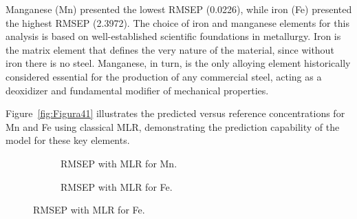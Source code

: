 \documentclass[12pt]{article}
\newcommand{\namostras}{Nº de amostras}
\newcommand{\oautor}{o autor}
\begin{document}
Manganese (Mn) presented the lowest RMSEP (0.0226), while iron (Fe) presented the highest RMSEP (2.3972). The choice of iron and manganese elements for this analysis is based on well-established scientific foundations in metallurgy. Iron is the matrix element that defines the very nature of the material, since without iron there is no steel. Manganese, in turn, is the only alloying element historically considered essential for the production of any commercial steel, acting as a deoxidizer and fundamental modifier of mechanical properties.

Figure~\ref{fig:Figura41} illustrates the predicted versus reference concentrations for Mn and Fe using classical MLR, demonstrating the prediction capability of the model for these key elements.

\begin{figure}[htbp]
\centering
\caption{RMSEP with MLR for Mn and Fe.}
\label{fig:Figura41}

\begin{subfigure}{0.48\textwidth}
\centering
{}
\caption{RMSEP with MLR for Mn.}
\label{fig:Figura41a}
\end{subfigure}
\hfill
\begin{subfigure}{0.48\textwidth}
\centering
{}
\caption{RMSEP with MLR for Fe.}
\label{fig:Figura41b}
\end{subfigure}

\end{figure}
\end{document}
